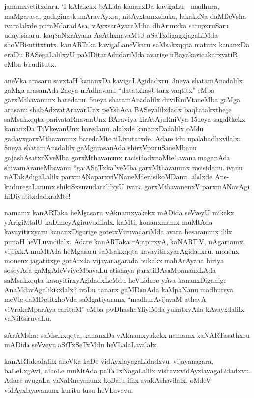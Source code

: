 \documentclass[11pt,a4size]{article}
\begin{document}
janamxvetitxdaru. `I kAlakekx bALida kananxDa kavigaLu---madhura,
maMgarasa, gadagina kumAravAyxsa, nitAyxtamxshuka, lakakxNa daMDeVsha
ivaralalxde puraMdaradAsa, vAyxsarAyaraMtha
 dhArimxka satupxruSaru
udayisidaru. kaqSaNxrAyana AsAthxnavaMtU aSaTxdigagxjagaLiMda
shoVBisutitxtutx. kanARTaka kavigaLaneVkaru saMsakxqqta matutx
kananxDa eraDu BASegaLalilxyU paMDitarAdudariMda avarige
uBayakavicakarxvatiR eMba biruditutx.

aneVka arasaru savxtaH kananxDa kavigaLAgidadxru. 3neya
shatamAnadalilx gaMga arasanAda 2neya mAdhavanu ``datatxkasUtarx
vaqtitx'' eMba garxMthavanunx baredanu. 5neya shatamAnadalilx
duviRniVtaneMba gaMga arasanu shabAdxvatAravanUnx peYshAca
BASeyalilxdadx baqhatakxthege saMsakxqqta parivataRnavanUnx BAraviya
kirAtAjuRniVya 15neya sagaRkekx kananxDa TiVkeyanUnx baredanu. alalxde
kananxDadalilx oMdu gadayxgarxMthavanunx baredaMte tiLiyutatxde. Adare
idu upalabadhxvilalx. 8neya shatamAnadalilx gaMgarasanAda
shirxVpuruSaneMbanu gajashAsatxrXveMba garxMthavanunx racisidadxnaMte!
avana maganAda shivamAraneMbavanu ``gajASaTxka''veMba garxMthavanunx
racisidanu. ivanu nATakAdigaLalilx
parxmANaparxviVNaneMdenisikoMDanu. alalxde Ane-kuduregaLanunx
shikiSxsuvudaralilxyU ivana garxMthavanenxV parxmANavAgi
hiDiyutitxdadxraMte!

namamx kanARTaka heMgasaru vAknamxyakekx mADida seVveyU mikakx
yArigiMtalU kaDimeyAgiruvudilalx. kaMti, honanxmamx muMtAda
kavayitirxyaru kananxDigarige gotetxViruvadariMda avara hesaranunx
ililx punaH heVLuvadilalx. Adare kanARTaka rAjapirxyA, kaNARTiV,
nAgamamx, vijijxkA muMtAda heMgasaru saMsakxqqta
kavayitirxyarAgidadxru. monenx monenx jagatitxge gotAtxda
vijayanagarada bukakx mahArAyana hiriya soseyAda gaMgAdeVviyeMbavaLu
atishaya parxtiBAsaMpananxLAda saMsakxqqta kavayitirxyAgidadxLeMdu
heVLidare yAva kananxDiganige AnaMdavAgalikikxlalx? ivaLu tananx
gaMDanAda kaMpaNanu madhureya meVle daMDetitxhoVda saMgatiyanunx
``madhurAvijayaM athavA viVrakaMparAya caritaM'' eMba pwDhasheYliyiMda
yukatxvAda kAvayxdalilx vaNiRsiruvaLu.

sArAMsha: saMsakxqqta, kananxDa vAknamxyakekx namamx kaNARTasathxru
mADida seVveyu aSiTxSeTxMdu heVLalaLavalalx. 

kanARTakadalilx aneVka kaDe vidAyxlayagaLidadxvu. vijayanagara,
baLeLxgAvi, aihoLe muMtAda paTaTxNagaLalilx
vishavxvidAyxlayagaLidadxvu. Adare avugaLa vaNaRneyanunx koDalu ililx
avakAshavilalx. oMdeV vidAyxlayavanunx kuritu tusu heVLuvevu.
\end{document}
